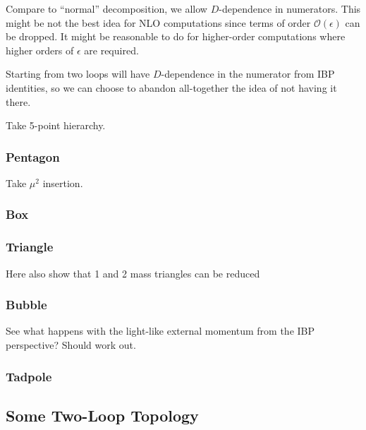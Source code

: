 Compare to ``normal'' decomposition, we allow $D$-dependence in numerators. This might be not the best
idea for NLO computations since terms of order $\mathcal{O}(\epsilon)$ can be dropped.
It might be reasonable to do for higher-order computations where higher orders of $\epsilon$ are required.

Starting from two loops will have $D$-dependence in the numerator from IBP identities, so
we can choose to abandon all-together the idea of not having it there.


Take 5-point hierarchy.

\subsubsection{Pentagon}

Take $\mu^2$ insertion.

\subsubsection{Box}

\subsubsection{Triangle}

Here also show that 1 and 2 mass triangles can be reduced

\subsubsection{Bubble}

See what happens with the light-like external momentum from the IBP perspective?
Should work out.

\subsubsection{Tadpole}

\subsection{Some Two-Loop Topology}


